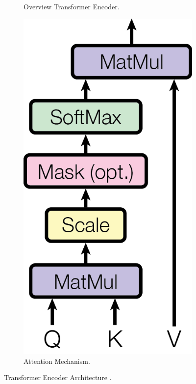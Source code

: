\begin{figure}[htbp]
\begin{subfigure}{0.3\textwidth}
      \caption{Overview Transformer Encoder.}
      \label{fig:encoder}
    \end{subfigure}
    \hspace{0.1\textwidth}
    \begin{subfigure}{0.3\textwidth}
        \includegraphics[width=\textwidth]{images/Transformer//AttentionHead.png}
        \caption{Attention Mechanism.}
      \label{fig:selfattention}
    \end{subfigure}
    \caption{Transformer Encoder Architecture \cite{transformer}.}
    \label{fig:main}
  \end{figure}

